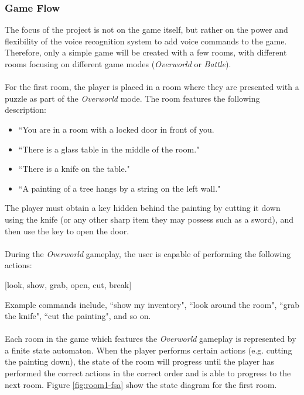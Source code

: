 \documentclass[11pt]{article}
\begin{document}
\subsubsection{Game Flow}

The focus of the project is not on the game itself, but rather on the power and flexibility of the voice recognition system to add voice commands to the game. Therefore, only a simple game will be created with a few rooms, with different rooms focusing on different game modes (\textit{Overworld} or \textit{Battle}).
\\
\\
For the first room, the player is placed in a room where they are presented with a puzzle as part of the \textit{Overworld} mode. The room features the following description:

\begin{itemize}
\item ``You are in a room with a locked door in front of you.

\item ``There is a glass table in the middle of the room."

\item ``There is a knife on the table."

\item ``A painting of a tree hangs by a string on the left wall."
\end{itemize}

The player must obtain a key hidden behind the painting by cutting it down using the knife (or any other sharp item they may possess such as a sword), and then use the key to open the door.
\\
\\
During the \textit{Overworld} gameplay, the user is capable of performing the following actions:

\begin{center}
[look, show, grab, open, cut, break]
\end{center}

Example commands include, ``show my inventory", ``look around the room", ``grab the knife", ``cut the painting", and so on.
\\
\\
Each room in the game which features the \textit{Overworld} gameplay is represented by a finite state automaton. When the player performs certain actions (e.g. cutting the painting down), the state of the room will progress until the player has performed the correct  actions in the correct order and is able to progress to the next room. Figure \ref{fig:room1-fsa} show the state diagram for the first room.
\end{document}
